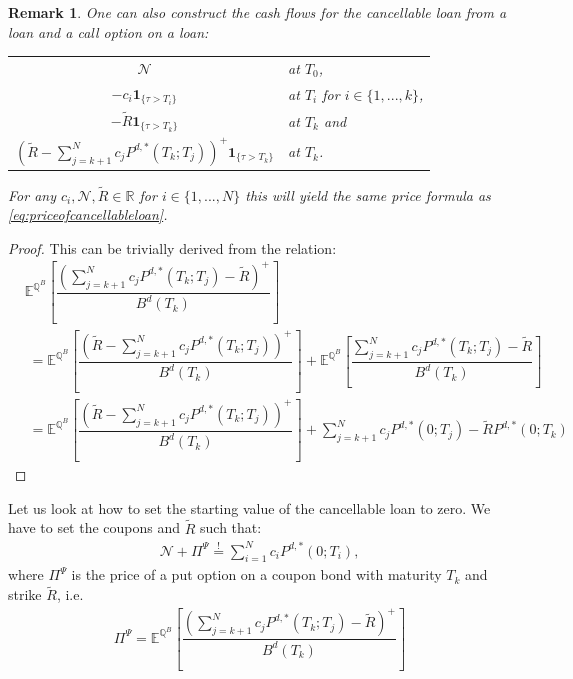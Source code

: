 \documentclass[12pt]{article}
\newcommand{\mbeq}{\overset{!}{=}}
\newtheorem{remark}[theorem]{Remark}
\begin{document}
	\begin{remark}
		One can also construct the cash flows for the cancellable loan from a loan and a call option on a loan:

		\begin{center}
			\begin{tabular}{cl}
				$\mathcal{N}$ & at $T_0$, \\
				$-c_i\mathbf{1}_{\{\tau > T_i\}}$ 		  & at $T_i$ for $i \in \{1, ..., k\}$, \\
				$-\tilde{R}\mathbf{1}_{\{\tau > T_k\}}$  & at $T_k$ and\\
				$\left(\tilde{R} - \sum_{j=k+1}^{N}c_jP^{d,*}(T_k;T_j) \right)^+\mathbf{1}_{\{\tau > T_k\}}$ 
				& at $T_k$.
			\end{tabular}
		\end{center}
		
		For any $c_i, \mathcal{N}, \tilde{R} \in \mathbb{R}$ for $i \in \{1, ..., N\}$ this will yield the same price formula as \cref{eq:priceofcancellableloan}.
	\end{remark}
	\begin{proof}
		This can be trivially derived from the relation:
		\begin{align*}
			&\mathbb{E}^{\mathbb{Q}^B}\left[\dfrac{\left(\sum_{j=k+1}^{N}c_jP^{d,*}(T_k;T_j) - \tilde{R}\right)^+}{B^d(T_k)}\right]\\
			&\;= \mathbb{E}^{\mathbb{Q}^B}\left[\dfrac{\left(\tilde{R} - \sum_{j=k+1}^{N}c_jP^{d,*}(T_k;T_j)\right)^+}{B^d(T_k)}\right]
			+ \mathbb{E}^{\mathbb{Q}^B}\left[\dfrac{\sum_{j=k+1}^{N}c_jP^{d,*}(T_k;T_j) - \tilde{R}}{B^d(T_k)}\right]\\
			&\;= \mathbb{E}^{\mathbb{Q}^B}\left[\dfrac{\left(\tilde{R} - \sum_{j=k+1}^{N}c_jP^{d,*}(T_k;T_j)\right)^+}{B^d(T_k)}\right]
			+\sum_{j=k+1}^{N}c_jP^{d,*}(0;T_j) - \tilde{R}P^{d,*}(0;T_k)
		\end{align*}
	\end{proof}
	Let us look at how to set the starting value of the cancellable loan to zero.
	We have to set the coupons and $\tilde{R}$ such that:
	\begin{align*}
		\mathcal{N} + \Pi^\Psi \mbeq \sum_{i=1}^{N}c_iP^{d,*}(0;T_i),
	\end{align*}
	where $\Pi^\Psi$ is the price of a put option on a coupon bond with maturity $T_k$ and strike $\tilde{R}$, i.e.
	\begin{align*}
		\Pi^\Psi = \mathbb{E}^{\mathbb{Q}^B}\left[\dfrac{\left(\sum_{j=k+1}^{N}c_jP^{d,*}(T_k;T_j) - \tilde{R}\right)^+}{B^d(T_k)}\right]
	\end{align*}
\end{document}
